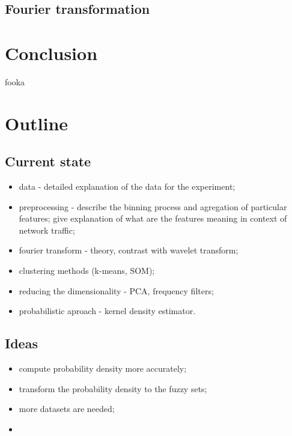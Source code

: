 \documentclass[a4paper]{IEEEtran}
\begin{document}
\subsection{Fourier transformation}

\section{Conclusion}
fooka

\section{Outline}
\subsection{Current state}
\begin{itemize}
	\item data - detailed explanation of the data for the experiment;
	\item preprocessing - describe the binning process and agregation of particular features; give explanation of what are the features meaning in context of network traffic;
	\item fourier transform - theory, contrast with wavelet transform;
	\item clustering methods (k-means, SOM);
	\item reducing the dimensionality - PCA, frequency filters;
	\item probabilistic aproach - kernel density estimator.
\end{itemize}
\subsection{Ideas}
\begin{itemize}
	\item compute probability density more accurately;
	\item transform the probability density to the fuzzy sets;
	\item more datasets are needed;
	\item 
\end{itemize}


\end{document}
